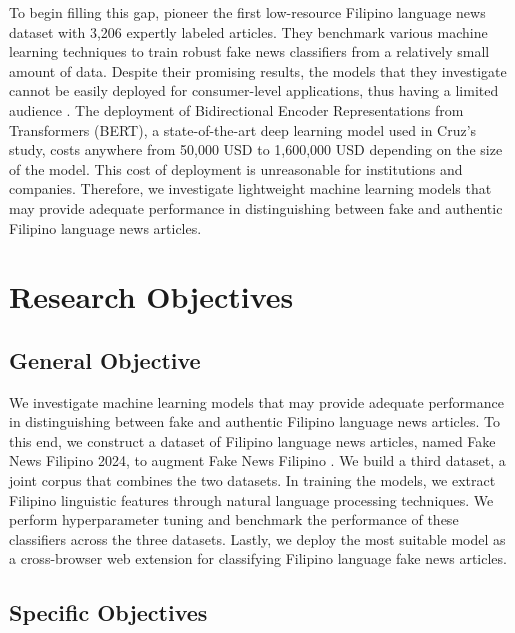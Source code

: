 To begin filling this gap,  pioneer the first low-resource Filipino language news dataset with 3,206 expertly labeled articles. They benchmark various machine learning techniques to train robust fake news classifiers from a relatively small amount of data. Despite their promising results, the models that they investigate cannot be easily deployed for consumer-level applications, thus having a limited audience . The deployment of Bidirectional Encoder Representations from Transformers (BERT), a state-of-the-art deep learning model used in Cruz's study, costs anywhere from 50,000 USD to 1,600,000 USD \cite{paleyes-2022} depending on the size of the model. This cost of deployment is unreasonable for institutions and companies. Therefore, we investigate lightweight machine learning models that may provide adequate performance in distinguishing between fake and authentic Filipino language news articles.

\section{Research Objectives}
\label{sec:researchobjectives}

\subsection{General Objective}
\label{sec:generalobjective}

We investigate machine learning models that may provide adequate performance in distinguishing between fake and authentic Filipino language news articles. To this end, we construct a dataset of Filipino language news articles, named Fake News Filipino 2024, to augment Fake News Filipino \cite{fake-news-filipino}. We build a third dataset, a joint corpus that combines the two datasets. In training the models, we extract Filipino linguistic features \cite{imperial-2020, imperial-2021} through natural language processing techniques. We perform hyperparameter tuning and benchmark the performance of these classifiers across the three datasets. Lastly, we deploy the most suitable model as a cross-browser web extension for classifying Filipino language fake news articles.

\subsection{Specific Objectives}
\label{sec:specificobjectives}

